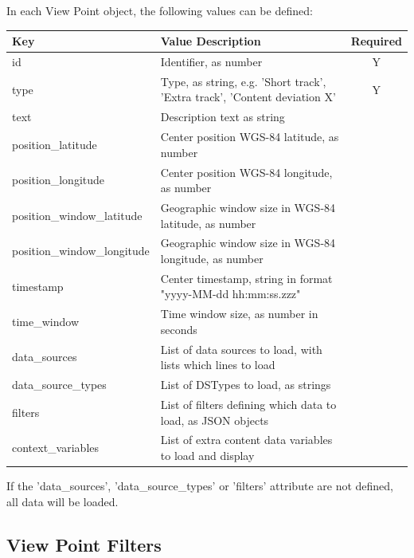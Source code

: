 In each View Point object, the following values can be defined:

\begin{center}
 \begin{table}[H]
  \begin{tabularx}{\textwidth}{ | l | X | c | }
    \hline
    \textbf{Key} & \textbf{Value Description} & \textbf{Required} \\ \hline
    id & Identifier, as number & Y \\ \hline
    type & Type, as string, e.g. 'Short track', 'Extra track', 'Content deviation X' & Y   \\ \hline
    text & Description text as string &    \\ \hline
    position\_latitude & Center position WGS-84 latitude, as number &    \\ \hline
    position\_longitude & Center position WGS-84 longitude, as number &    \\ \hline
    position\_window\_latitude & Geographic window size in WGS-84 latitude, as number &    \\ \hline
    position\_window\_longitude & Geographic window size in WGS-84 longitude, as number &    \\ \hline
    timestamp & Center timestamp, string in format "yyyy-MM-dd hh:mm:ss.zzz" &    \\ \hline
    time\_window & Time window size, as number in seconds &    \\ \hline
    data\_sources & List of data sources to load, with lists which lines to load &    \\ \hline
    data\_source\_types & List of DSTypes to load, as strings &    \\ \hline
    filters & List of filters defining which data to load, as JSON objects &   \\ \hline
    context\_variables & List of extra content data variables to load and display &    \\ \hline
\end{tabularx}
\end{table}
\end{center}

If the 'data\_sources', 'data\_source\_types' or 'filters' attribute are not defined, all data will be loaded.

\subsection{View Point Filters}

